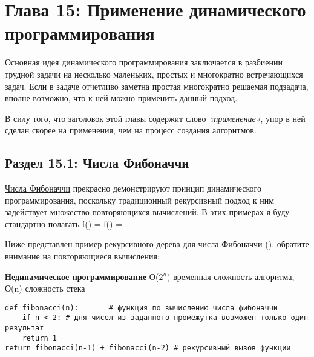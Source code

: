 \chapter*{Глава 15: Применение динамического программирования}

\vspace{\baselineskip}
Основная идея динамического программирования заключается в разбиении трудной задачи на несколько маленьких, простых и многократно встречающихся задач. Если в задаче отчетливо заметна простая многократно решаемая подзадача, вполне возможно, что к ней можно применить данный подход.

\vspace{\baselineskip}
В силу того, что заголовок этой главы содержит слово {\itshape «применение»}, упор в ней сделан скорее на применения, чем на процесс создания алгоритмов.

\vspace{\baselineskip}
\section*{Раздел 15.1: Числа Фибоначчи}

\vspace{\baselineskip} 
\href{https://vk.cc/atMGsz}{\underline{Числа Фибоначчи}} прекрасно демонстрируют принцип динамического программирования, поскольку традиционный рекурсивный подход к ним задействует множество повторяющихся вычислений. В этих примерах я буду стандартно полагать f() = f() = .

\vspace{\baselineskip}
Ниже представлен пример рекурсивного дерева для числа Фибоначчи (), обратите внимание на повторяющиеся вычисления:


\vspace{\baselineskip}
\textbf{Нединамическое программирование} О($2^n$) временная сложность алгоритма, О(n) сложность стека 

\vspace{\baselineskip}
\begin{tcolorbox}
\begin{verbatim}
def fibonacci(n):       # функция по вычислению числа фибоначчи
    if n < 2: # для чисел из заданного промежутка возможен только один результат
    return 1    
return fibonacci(n-1) + fibonacci(n-2) # рекурсивный вызов функции
\end{verbatim}
\end{tcolorbox}


